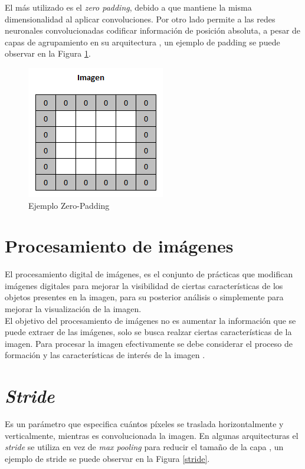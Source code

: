 El más utilizado es el \textit{zero padding}, debido a que mantiene la misma dimensionalidad al aplicar convoluciones. Por otro lado permite a las redes neuronales convolucionadas codificar información de posición absoluta, a pesar de capas de agrupamiento en su arquitectura \cite{islam2021position}, un ejemplo de padding se puede observar en la Figura \ref{padding}.

\begin{figure}[ht]
	\centering
	\includegraphics[scale=0.65]{Figs/padding.png}
	\caption{Ejemplo Zero-Padding}
	\label{padding}
\end{figure}


\newpage
\section{Procesamiento de imágenes} El procesamiento digital de imágenes, es el conjunto de prácticas que modifican imágenes digitales para mejorar la visibilidad de ciertas características de los objetos presentes en la imagen, para su posterior análisis o simplemente para mejorar la visualización de la
imagen.\\

El objetivo del procesamiento de imágenes no es aumentar la información que se puede extraer de las imágenes, solo se busca realzar ciertas características de la imagen. Para procesar la imagen efectivamente se debe considerar el proceso de formación y las características de interés de la imagen \cite{ref_13}.


\section{\textit{Stride}}


Es un parámetro que especifica cuántos píxeles se traslada horizontalmente y verticalmente, mientras es convolucionada la imagen. En algunas arquitecturas el \textit{stride} se utiliza en vez de \textit{max pooling} para reducir el tamaño de la capa \cite{murphy2016overview}, un ejemplo de stride se puede observar en la Figura \ref{stride}.


